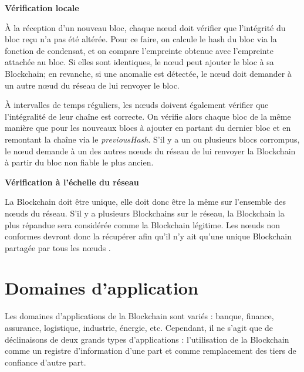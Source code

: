 \documentclass{article}
\newcommand{\noeud}{n\oe ud }
\newcommand{\noeuds}{n\oe uds }
\begin{document}
\textbf{Vérification locale}

À la réception d'un nouveau bloc, chaque \noeud doit vérifier que l'intégrité du bloc reçu n'a pas été altérée. Pour ce faire, on calcule le hash du bloc via la fonction de condensat, et on compare l'empreinte obtenue avec l'empreinte attachée au bloc. Si elles sont identiques, le \noeud peut ajouter le bloc à sa Blockchain; en revanche, si une anomalie est détectée, le \noeud doit demander à un autre \noeud du réseau de lui renvoyer le bloc.

À intervalles de temps réguliers, les \noeuds doivent également vérifier que l'intégralité de leur chaîne est correcte. On vérifie alors chaque bloc de la même manière que pour les nouveaux blocs à ajouter en partant du dernier bloc et en remontant la chaîne via le \textit{previousHash}. S’il y a un ou plusieurs blocs corrompus, le \noeud demande à un des autres \noeuds du réseau de lui renvoyer la Blockchain à partir du bloc non fiable le plus ancien. %

\newpage


\textbf{Vérification à l'échelle du réseau}

La Blockchain doit être unique, elle doit donc être la même sur l'ensemble des \noeuds du réseau. S’il y a plusieurs Blockchains sur le réseau, la Blockchain la plus répandue sera considérée comme la Blockchain légitime. Les \noeuds non conformes devront donc la récupérer afin qu'il n'y ait qu'une unique Blockchain partagée par tous les \noeuds.

\section{Domaines d'application}

Les domaines d'applications de la Blockchain sont variés : banque, finance, assurance, logistique, industrie, énergie, etc. Cependant, il ne s'agit que de déclinaisons de deux grands types d'applications : l'utilisation de la Blockchain comme un registre d'information d'une part et comme remplacement des tiers de confiance d'autre part.
\end{document}
